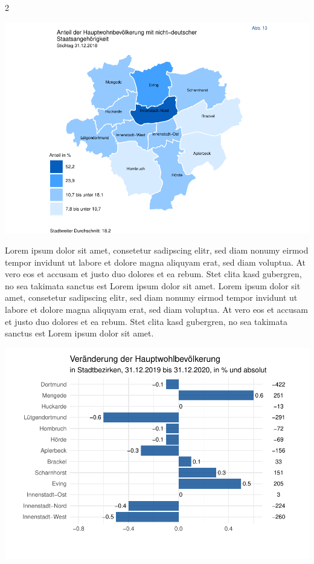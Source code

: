 \documentclass[
  a4paper,
  twoside]{article}
\begin{document}
\begin {multicols}{2}

\begin{flushright}\includegraphics[width=1\linewidth]{2021-03-02_Beispiel_files/figure-latex/Plot map-1} \end{flushright}

Lorem ipsum dolor sit amet, consetetur sadipscing elitr, sed diam nonumy eirmod tempor invidunt ut labore et dolore magna aliquyam erat, sed diam voluptua. At vero eos et accusam et justo duo dolores et ea rebum. Stet clita kasd gubergren, no sea takimata sanctus est Lorem ipsum dolor sit amet. Lorem ipsum dolor sit amet, consetetur sadipscing elitr, sed diam nonumy eirmod tempor invidunt ut labore et dolore magna aliquyam erat, sed diam voluptua. At vero eos et accusam et justo duo dolores et ea rebum. Stet clita kasd gubergren, no sea takimata sanctus est Lorem ipsum dolor sit amet.

\includegraphics[width=1\linewidth]{2021-03-02_Beispiel_files/figure-latex/unnamed-chunk-1-1}


\end{multicols}
\end{document}
